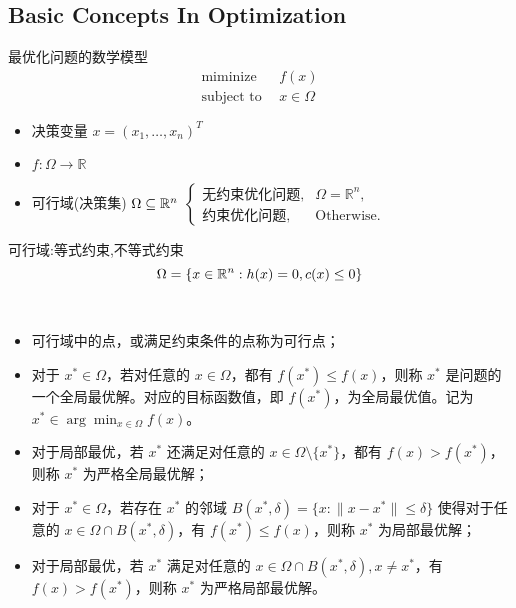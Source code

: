 \documentclass{mytemplate}
\begin{document}
\subsection{Basic Concepts In Optimization}
\begin{definition}
    最优化问题的数学模型\\
    \begin{align}
        \text{miminize}  \ \  & f(x)         \\
        \text{subject to}\ \  & x \in \Omega
    \end{align}
    \begin{itemize}
        \item 决策变量 $x=(x_1, \dots, x_n)^T$\\
        \item \(f: \Omega \rightarrow \mathbb{R}\)\\
        \item 可行域(决策集) \( \Omega \subseteq \mathbb{R}^n\)
              $\begin{cases}
                      \text{无约束优化问题}, & \Omega = \mathbb{R}^n, \\
                      \text{约束优化问题},  & \text{Otherwise.}
                  \end{cases}
              $
    \end{itemize}
    可行域:等式约束,不等式约束
    \[
        \Omega = \{ x \in \mathbb{R}^n: h(x) =0, c(x) \leq 0 \}
    \]
\end{definition}

\begin{definition}
    \mbox{}\\
    \vspace{-\baselineskip}
    \begin{itemize}
        \item 可行域中的点，或满足约束条件的点称为可行点；
        \item 对于 \(x^* \in \Omega\)，若对任意的 \(x \in \Omega\)，都有 \(f(x^*) \leq f(x)\)，则称 \(x^*\) 是问题的一个全局最优解。对应的目标函数值，即 \(f(x^*)\)，为全局最优值。记为 \(x^* \in \arg\min_{x\in\Omega} f(x)\)。
        \item 对于局部最优，若 \(x^*\) 还满足对任意的 \(x \in \Omega\setminus\{x^*\}\)，都有 \(f(x) > f(x^*)\)，则称 \(x^*\) 为严格全局最优解；
        \item 对于 \(x^* \in \Omega\)，若存在 \(x^*\) 的邻域 \(B(x^*, \delta) = \{x: \|x - x^*\| \leq \delta\}\) 使得对于任意的 \(x \in \Omega \cap B(x^*, \delta)\)，有 \(f(x^*) \leq f(x)\)，则称 \(x^*\) 为局部最优解；
        \item 对于局部最优，若 \(x^*\) 满足对任意的 \(x \in \Omega \cap B(x^*, \delta), x \neq x^*\)，有 \(f(x) > f(x^*)\)，则称 \(x^*\) 为严格局部最优解。
    \end{itemize}
\end{definition}
\end{document}
